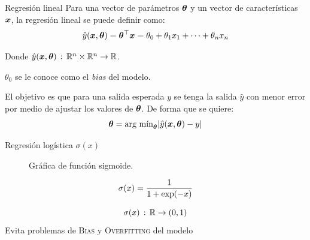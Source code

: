 \documentclass[10pt]{beamer}
\begin{document}
\begin{frame}{Regresión lineal}
  Para una vector de parámetros ${\bm{\theta}}$ y un vector de características ${\bm{x}}$, la regresión lineal se puede definir como:
  \begin{equation*}
    \hat{y}({\bm{x}}, {\bm{\theta}}) = {\bm{\theta}}^{\top} {\bm{x}} = \theta_0 + \theta_1 x_1 + \cdots + \theta_n x_n
  \end{equation*}

  Donde $\hat{y}({\bm{x}}, {\bm{\theta}}) \,:\, \mathbb{R}^n \times \mathbb{R}^n \rightarrow \mathbb{R}$.
  
  $\theta_0$ se le conoce como el \emph{bias} del modelo.

  El objetivo es que para una salida esperada $y$ se tenga la salida $\hat{y}$ con menor error por medio de ajustar los valores de ${\bm{\theta}}$. De forma que se quiere:
  \begin{equation*}
    \vtheta = \text{arg m\'{\i}n}_{\vtheta} | \hat{y}(\vx, \vtheta) - y|
  \end{equation*}

\end{frame}

\begin{frame}{Regresión logística $\sigma(x)$}
  \noindent\begin{minipage}{0.6\textwidth}
    \begin{figure}[H]
      \centering
      \caption[Gráfica de función sigmoide]{Gráfica de función sigmoide.}
      \label{fig:logits-example}
    \end{figure}
  \end{minipage}%
  \hfill%
  \begin{minipage}{0.35\textwidth}
    \begin{equation*}
      \sigma(x) = \frac{1}{1+\exp(-x)}
    \end{equation*}
    
    \begin{equation*}
      \sigma(x) \,:\, \mathbb{R} \rightarrow (0,1)
    \end{equation*}
    Evita problemas de \textsc{Bias} y \textsc{Overfitting} del modelo
  \end{minipage}
\end{frame}
\end{document}
